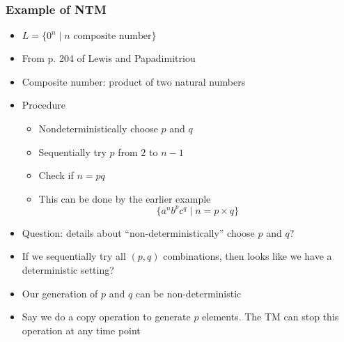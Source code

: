 \begin{frame}[allowframebreaks]
\begin{itemize}
\end{itemize}\end{frame} \begin{frame}[allowframebreaks] \frametitle{Example of NTM}
  \begin{itemize}
\item $L=\{0^n\mid n \mbox{ composite number}\}$
\item From p. 204 of Lewis and Papadimitriou
\item Composite number: product of two natural numbers
\item Procedure
  \begin{itemize}
  \item Nondeterministically choose $p$ and $q$

  \item [] Sequentially try $p$ from $2$ to $n-1$

  \item Check if $n=pq$

  \item [] This can be done by the earlier example
    \begin{equation*}
    \{a^n b^p c^q\mid n = p \times q\}
  \end{equation*}
  \end{itemize}
\item Question: details about ``non-deterministically'' choose $p$ and $q$?
\item If we sequentially try all $(p,q)$ combinations, then
  looks like we have a deterministic setting?
  
\item Our generation of  $p$ and $q$ can be non-deterministic
\item Say we do a copy operation to generate $p$ elements. The TM can
  stop this operation at any time point
\end{itemize}\end{frame}




